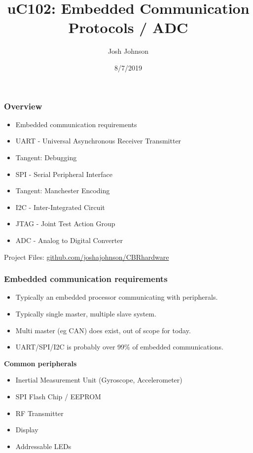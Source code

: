 \documentclass[t]{beamer}
\title[uC102]{uC102: Embedded Communication Protocols / ADC} %
\author{Josh Johnson} %
\institute[] %
{ \\ %
\medskip
\textit{} %
}
\date{8/7/2019} %
\begin{document}
\begin{frame}
\titlepage %
\end{frame}


\begin{frame}
\frametitle{Overview}
\begin{itemize}
\item Embedded communication requirements
\item UART - Universal Asynchronous Receiver Transmitter
\item Tangent: Debugging
\item SPI - Serial Peripheral Interface
\item Tangent: Manchester Encoding
\item I2C - Inter-Integrated Circuit 
\item JTAG	- Joint Test Action Group
\item ADC - Analog to Digital Converter
	

\end{itemize}
\vspace{20mm}
Project Files: \url{github.com/joshajohnson/CBRhardware}\\
\end{frame}


\begin{frame}[t]
\frametitle{Embedded communication requirements}
\begin{itemize}
	\item Typically an embedded processor communicating with peripherals.
	\item Typically single master, multiple slave system.
	\item Multi master (eg CAN) does exist, out of scope for today.
	\item UART/SPI/I2C is probably over 99\% of embedded communications.
\end{itemize}
\vspace{5mm}
\textbf{Common peripherals}
\begin{itemize}
	\item Inertial Measurement Unit (Gyroscope, Accelerometer)
	\item SPI Flash Chip / EEPROM
	\item RF Transmitter
	\item Display
	\item Addressable LEDs
\end{itemize}

\end{frame}
\end{document}

